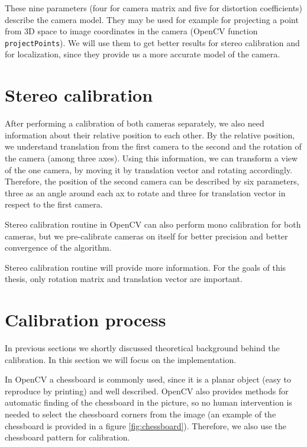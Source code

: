 These nine parameters (four for camera matrix and five for distortion
coefficients) describe the camera model. They may be used for example for
projecting a point from 3D space to image coordinates in the camera (OpenCV
function \verb+projectPoints+). We will use them to get better results for
stereo calibration and for localization, since they provide us a more accurate
model of the camera.



\section{Stereo calibration}

After performing a calibration of both cameras separately, we also need
information about their relative position to each other. By the relative
position, we understand translation from the first camera to the second and the
rotation of the camera (among three axes). Using this information, we can
transform a view of the one camera, by moving it by translation vector and
rotating accordingly. Therefore, the position of the second camera can be
described by six parameters, three as an angle around each ax to rotate and
three for translation vector in respect to the first camera.

Stereo calibration routine in OpenCV can also perform mono calibration for both
cameras, but we pre-calibrate cameras on itself for better precision and better
convergence of the algorithm.

Stereo calibration routine will provide more information. For the goals of this
thesis, only rotation matrix and translation vector are important.

\section{Calibration process}

In previous sections we shortly discussed theoretical background behind the
calibration. In this section we will focus on the implementation.

In OpenCV a chessboard is commonly used, since it is a planar object (easy to
reproduce by printing) and well described. OpenCV also provides methods for
automatic finding of the chessboard in the picture, so no human intervention is
needed to select the chessboard corners from the image (an example of the
chessboard is provided in a figure \ref{fig:chessboard}). Therefore, we also
use the chessboard pattern for calibration.

